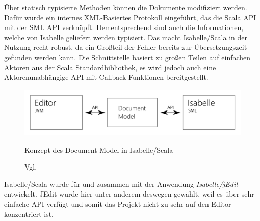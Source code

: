 Über statisch typisierte Methoden können die Dokumente modifiziert werden. Dafür wurde ein internes
XML-Basiertes Protokoll eingeführt, das die Scala API mit der SML API verknüpft. Dementsprechend
sind auch die Informationen, welche von Isabelle geliefert werden typisiert. Das macht
Isabelle/Scala in der Nutzung recht robust, da ein Großteil der Fehler bereits zur Übersetzungszeit
gefunden werden kann. Die Schnittstelle basiert zu großen Teilen auf einfachen Aktoren aus der Scala
Standardbibliothek, es wird jedoch auch eine Aktorenunabhängige API mit Callback-Funktionen
bereitgestellt.

\begin{figure}[ht]
\includegraphics[width=\linewidth]{images/diagram-iscala}
  \caption{Konzept des Document Model in Isabelle/Scala}
  \caption*{Vgl. \cite{iscala}}
  \label{fig:diagram-iscala}
\end{figure}

Isabelle/Scala wurde für und zusammen mit der Anwendung \textit{Isabelle/jEdit} entwickelt. JEdit
wurde hier unter anderem deswegen gewählt, weil es über sehr einfache API verfügt und somit das
Projekt nicht zu sehr auf den Editor konzentriert ist.